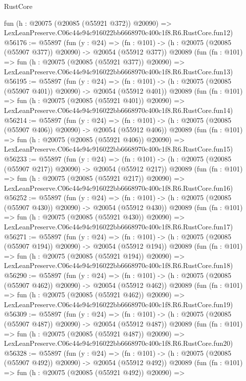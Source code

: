 \begin{lexlean}{RustCore}
\begin{coremodule}
    fun (h : @20075 (@20085 (@55921 @372)) @20090) =>
    LexLeanPreserve.C06c44e94c916022bb6668970c400c1f8.R6.RustCore.fun12)
@56176 := @55897
    (fun (y : @24) =>
    (fn : @101) -> (h : @20075 (@20085 (@55907 @377)) @20090) -> @20054 (@55912 @377))
    @20089
    (fun (fn : @101) =>
    fun (h : @20075 (@20085 (@55921 @377)) @20090) =>
    LexLeanPreserve.C06c44e94c916022bb6668970c400c1f8.R6.RustCore.fun13)
@56195 := @55897
    (fun (y : @24) =>
    (fn : @101) -> (h : @20075 (@20085 (@55907 @401)) @20090) -> @20054 (@55912 @401))
    @20089
    (fun (fn : @101) =>
    fun (h : @20075 (@20085 (@55921 @401)) @20090) =>
    LexLeanPreserve.C06c44e94c916022bb6668970c400c1f8.R6.RustCore.fun14)
@56214 := @55897
    (fun (y : @24) =>
    (fn : @101) -> (h : @20075 (@20085 (@55907 @406)) @20090) -> @20054 (@55912 @406))
    @20089
    (fun (fn : @101) =>
    fun (h : @20075 (@20085 (@55921 @406)) @20090) =>
    LexLeanPreserve.C06c44e94c916022bb6668970c400c1f8.R6.RustCore.fun15)
@56233 := @55897
    (fun (y : @24) =>
    (fn : @101) -> (h : @20075 (@20085 (@55907 @217)) @20090) -> @20054 (@55912 @217))
    @20089
    (fun (fn : @101) =>
    fun (h : @20075 (@20085 (@55921 @217)) @20090) =>
    LexLeanPreserve.C06c44e94c916022bb6668970c400c1f8.R6.RustCore.fun16)
@56252 := @55897
    (fun (y : @24) =>
    (fn : @101) -> (h : @20075 (@20085 (@55907 @430)) @20090) -> @20054 (@55912 @430))
    @20089
    (fun (fn : @101) =>
    fun (h : @20075 (@20085 (@55921 @430)) @20090) =>
    LexLeanPreserve.C06c44e94c916022bb6668970c400c1f8.R6.RustCore.fun17)
@56271 := @55897
    (fun (y : @24) =>
    (fn : @101) -> (h : @20075 (@20085 (@55907 @194)) @20090) -> @20054 (@55912 @194))
    @20089
    (fun (fn : @101) =>
    fun (h : @20075 (@20085 (@55921 @194)) @20090) =>
    LexLeanPreserve.C06c44e94c916022bb6668970c400c1f8.R6.RustCore.fun18)
@56290 := @55897
    (fun (y : @24) =>
    (fn : @101) -> (h : @20075 (@20085 (@55907 @462)) @20090) -> @20054 (@55912 @462))
    @20089
    (fun (fn : @101) =>
    fun (h : @20075 (@20085 (@55921 @462)) @20090) =>
    LexLeanPreserve.C06c44e94c916022bb6668970c400c1f8.R6.RustCore.fun19)
@56309 := @55897
    (fun (y : @24) =>
    (fn : @101) -> (h : @20075 (@20085 (@55907 @487)) @20090) -> @20054 (@55912 @487))
    @20089
    (fun (fn : @101) =>
    fun (h : @20075 (@20085 (@55921 @487)) @20090) =>
    LexLeanPreserve.C06c44e94c916022bb6668970c400c1f8.R6.RustCore.fun20)
@56328 := @55897
    (fun (y : @24) =>
    (fn : @101) -> (h : @20075 (@20085 (@55907 @492)) @20090) -> @20054 (@55912 @492))
    @20089
    (fun (fn : @101) =>
    fun (h : @20075 (@20085 (@55921 @492)) @20090) =>

\end{coremodule}
\end{lexlean}
